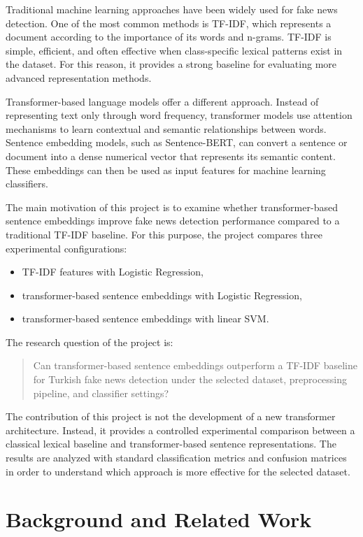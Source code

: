 \documentclass[11pt]{article}
\begin{document}
Traditional machine learning approaches have been widely used for fake news detection. One of the most common methods is TF-IDF, which represents a document according to the importance of its words and n-grams. TF-IDF is simple, efficient, and often effective when class-specific lexical patterns exist in the dataset. For this reason, it provides a strong baseline for evaluating more advanced representation methods.

Transformer-based language models offer a different approach. Instead of representing text only through word frequency, transformer models use attention mechanisms to learn contextual and semantic relationships between words. Sentence embedding models, such as Sentence-BERT, can convert a sentence or document into a dense numerical vector that represents its semantic content. These embeddings can then be used as input features for machine learning classifiers.

The main motivation of this project is to examine whether transformer-based sentence embeddings improve fake news detection performance compared to a traditional TF-IDF baseline. For this purpose, the project compares three experimental configurations:

\begin{itemize}
    \item TF-IDF features with Logistic Regression,
    \item transformer-based sentence embeddings with Logistic Regression,
    \item transformer-based sentence embeddings with linear SVM.
\end{itemize}

The research question of the project is:

\begin{quote}
Can transformer-based sentence embeddings outperform a TF-IDF baseline for Turkish fake news detection under the selected dataset, preprocessing pipeline, and classifier settings?
\end{quote}

The contribution of this project is not the development of a new transformer architecture. Instead, it provides a controlled experimental comparison between a classical lexical baseline and transformer-based sentence representations. The results are analyzed with standard classification metrics and confusion matrices in order to understand which approach is more effective for the selected dataset.

\section{Background and Related Work}
\end{document}
